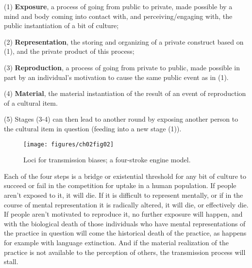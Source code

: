 \begin{list}{}{}
\item 
(1) \textbf{Exposure}, a process of going from public to private, 
made possible by a mind and body coming into contact with, and 
perceiving/engaging with, the public instantiation of a bit of culture;



(2) \textbf{Representation}, the storing and organizing of a private 
construct based on (1), and the private product of this process;



(3) \textbf{Reproduction}, a process of going from private to public, 
made possible in part by an individual's motivation to cause the same 
public event as in (1). 



(4) \textbf{Material}, the material instantiation of the result of an 
event of reproduction of a cultural item.



(5) Stages (3-4) can then lead to another round by exposing another 
person to the cultural item in question (feeding into a new stage (1)). 

\end{list}





\begin{figure}[h!]
\texttt{[image: figures/ch02fig02]}
\caption{Loci for transmission biases; a four-stroke engine model.}
\end{figure}




Each of the four steps is a bridge or existential threshold for any bit 
of culture to succeed or fail in the competition for uptake in a human 
population. If people aren't exposed to it, it will die. If it is 
difficult to represent mentally, or if in the course of mental 
representation it is radically altered, it will die, or effectively die. 
If people aren't motivated to reproduce it, no further exposure will 
happen, and with the biological death of those individuals who have 
mental representations of the practice in question will come the 
historical death of the practice, as happens for example with language 
extinction. And if the material realization of the practice is not 
available to the perception of others, the transmission process will 
stall. 




